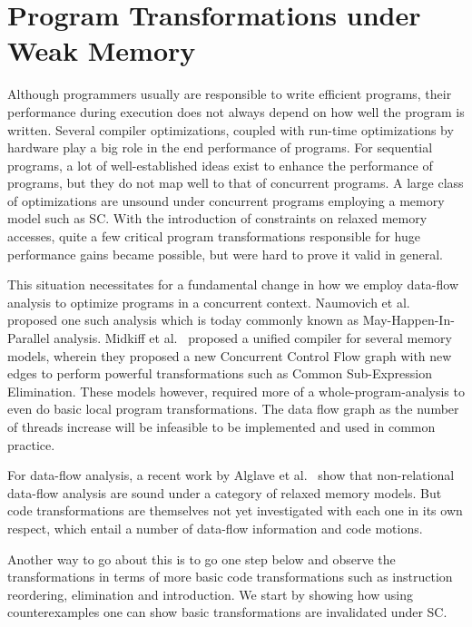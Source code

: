 \section{Program Transformations under Weak Memory}

    Although programmers usually are responsible to write efficient programs, their performance during execution does not always depend on how well the program is written. 
    Several compiler optimizations, coupled with run-time optimizations by hardware play a big role in the end performance of programs.
    For sequential programs, a lot of well-established ideas exist to enhance the performance of programs, but they do not map well to that of concurrent programs. 
    A large class of optimizations are unsound under concurrent programs employing a memory model such as SC.
    With the introduction of constraints on relaxed memory accesses, quite a few critical program transformations responsible for huge performance gains became possible, but were hard to prove it valid in general. 

    This situation necessitates for a fundamental change in how we employ data-flow analysis to optimize programs in a concurrent context. Naumovich et al.~\cite{NaumovichA} proposed one such analysis which is today commonly known as May-Happen-In-Parallel analysis. 
    Midkiff et al.~\cite{Midkiff} proposed a unified compiler for several memory models, wherein they proposed a new Concurrent Control Flow graph with new edges to perform powerful transformations such as Common Sub-Expression Elimination. 
    These models however, required more of a whole-program-analysis to even do basic local program transformations. 
    The data flow graph as the number of threads increase will be infeasible to be implemented and used in common practice. 
   
    For data-flow analysis, a recent work by Alglave et al.~\cite{Alglave2} show that non-relational data-flow analysis are sound under a category of relaxed memory models. 
    But code transformations are themselves not yet investigated with each one in its own respect, which entail a number of data-flow information and code motions.
    
    Another way to go about this is to go one step below and observe the transformations in terms of more basic code transformations such as instruction reordering, elimination and introduction.   
    We start by showing how using counterexamples one can show basic transformations are invalidated under SC.

